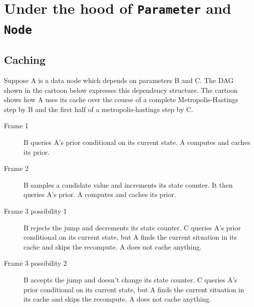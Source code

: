 \documentclass[]{book}
\begin{document}
\section{Under the hood of \texttt{Parameter} and \texttt{Node}}\label{sec:underhood} %

\subsection{Caching}\label{sub:caching}

Suppose A  is a data node which depends on parameters  B  and  C. The DAG shown in the cartoon below expresses this dependency structure. The cartoon shows how A uses its cache over the course of a complete Metropolis-Hastings step by B and the first half of a metropolis-hastings step by C.

\begin{description}
\item[Frame 1] B queries A's prior conditional on its current state. A computes and caches its prior.
\begin{center}
\end{center}

\item[Frame 2] B samples a candidate value and increments its state counter. It then queries A's prior. A computes and caches its prior.
\begin{center}
\end{center}

\item[Frame 3 possibility 1] B rejects the jump and decrements its state counter. C queries A's prior conditional on its current state, but A finds the current situation in its cache and skips the recompute. A does not cache anything.
\begin{center}
\end{center}

\item[Frame 3 possibility 2] B accepts the jump and doesn't change its state counter. C queries A's prior conditional on its current state, but A finds the current situation in its cache and skips the recompute. A does not cache anything.
\begin{center}
\end{center}

\end{description}
\end{document}
